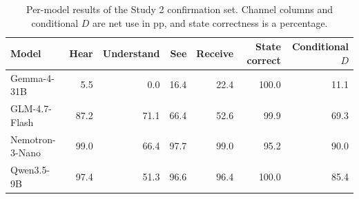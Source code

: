 \documentclass[11pt]{article}
\begin{document}
\begin{table}[!tp]
\centering\setlength{\tabcolsep}{4.5pt}\small
\begin{lrbox}{\OCtable}\begin{tabular*}{\linewidth}{@{\extracolsep{\fill}}lrrrrrr@{}}
\toprule
\textbf{Model} & \textbf{Hear} & \textbf{Understand} & \textbf{See} & \textbf{Receive} & \textbf{State correct} & \textbf{Conditional $D$}\\
\midrule
Gemma-4-31B & 5.5 & 0.0 & 16.4 & 22.4 & 100.0 & 11.1\\
GLM-4.7-Flash & 87.2 & 71.1 & 66.4 & 52.6 & 99.9 & 69.3\\
Nemotron-3-Nano & 99.0 & 66.4 & 97.7 & 99.0 & 95.2 & 90.0\\
Qwen3.5-9B & 97.4 & 51.3 & 96.6 & 96.4 & 100.0 & 85.4\\
\bottomrule
\end{tabular*}\end{lrbox}
\ifdim\wd\OCtable>\linewidth\PackageError{access-paper}{Table tab:modeldetail exceeds its column}{Revise the table layout.}\fi
\usebox{\OCtable}
\caption{Per-model results of the Study 2 confirmation set. Channel columns and conditional $D$ are net use in pp, and state correctness is a percentage.}
\label{tab:modeldetail}
\end{table}
\end{document}

